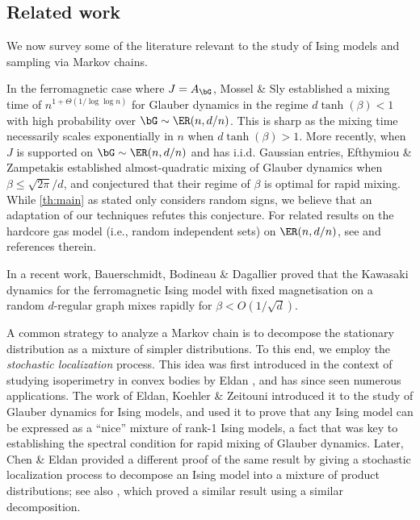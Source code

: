 \documentclass[11pt,letterpaper]{article}
\begin{document}
\subsection{Related work}
We now survey some of the literature relevant to the study of Ising models and sampling via Markov chains.

In the ferromagnetic case where $J = A_{\bG}$, Mossel \& Sly \cite{ms13} established a mixing time of $n^{1 + \Theta(1/\log\log n)}$ for Glauber dynamics in the regime $d \tanh(\beta) < 1$ with high probability over $\bG \sim \ER(n,d/n)$. This is sharp as the mixing time necessarily scales exponentially in $n$ when $d \tanh(\beta) > 1$. More recently, when $J$ is supported on $\bG \sim \ER(n,d/n)$ and has i.i.d. Gaussian entries, Efthymiou \& Zampetakis \cite{EZ24} established almost-quadratic mixing of Glauber dynamics when $\beta \leq \sqrt{2\pi}/d$, and conjectured that their regime of $\beta$ is optimal for rapid mixing. While \cref{th:main} as stated only considers random signs, we believe that an adaptation of our techniques refutes this conjecture. For related results on the hardcore gas model (i.e., random independent sets) on $\ER(n,d/n)$, see \cite{EF23} and references therein.

In a recent work, Bauerschmidt, Bodineau \& Dagallier \cite{BBD23} proved that the Kawasaki dynamics for the ferromagnetic Ising model with fixed magnetisation on a random $d$-regular graph mixes rapidly for $\beta < O\left(1/\sqrt{d}\right)$.



A common strategy to analyze a Markov chain is to decompose the stationary distribution as a mixture of simpler distributions.
To this end, we employ the \emph{stochastic localization} process.
This idea was first introduced in the context of studying isoperimetry in convex bodies by Eldan \cite{Eld13}, and has since seen numerous applications.
The work of Eldan, Koehler \& Zeitouni \cite{EKZ22} introduced it to the study of Glauber dynamics for Ising models, and used it to prove that any Ising model can be expressed as a ``nice'' mixture of rank-1 Ising models, a fact that was key to establishing the spectral condition for rapid mixing of Glauber dynamics.
Later, Chen \& Eldan \cite{CE22} provided a different proof of the same result by giving a stochastic localization process to decompose an Ising model into a mixture of product distributions; see also \cite{BB19}, which proved a similar result using a similar decomposition.
\end{document}
